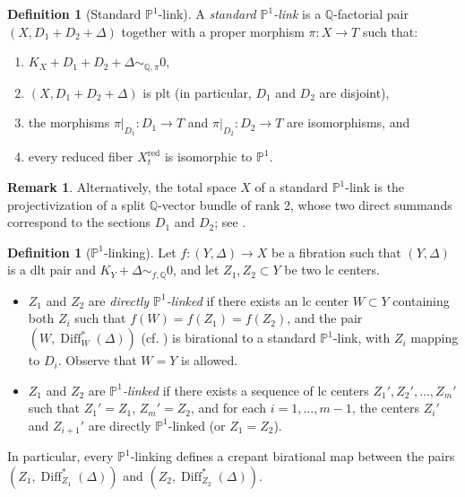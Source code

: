 \documentclass{amsart}
\theoremstyle{definition}
\newtheorem{definition}[theorem]{Definition}
\newtheorem{remark}[theorem]{Remark}
\theoremstyle{remark}
\def\bQ{\mathbb{Q}}
\def\bP{\mathbb{P}}
\numberwithin{equation}{section}
\begin{document}
\begin{definition}[Standard $\mathbb{P}^1$-link]\label{def:P1link}
A \emph{standard $\mathbb{P}^1$-link} is a $\mathbb{Q}$-factorial pair $(X, D_1 + D_2 + \Delta)$ together with a proper morphism $\pi: X \to T$ such that:
\begin{enumerate}
    \item $K_X + D_1 + D_2 + \Delta \sim_{\mathbb{Q}, \pi} 0$,
    \item $(X, D_1 + D_2 + \Delta)$ is plt (in particular, $D_1$ and $D_2$ are disjoint),
    \item the morphisms $\pi|_{D_1}: D_1 \to T$ and $\pi|_{D_2}: D_2 \to T$ are isomorphisms, and
    \item every reduced fiber $X_t^{\mathrm{red}}$ is isomorphic to $\mathbb{P}^1$.
\end{enumerate}
\end{definition}
\begin{remark}
Alternatively, the total space $X$ of a standard $\mathbb{P}^1$-link is the projectivization of a split $\bQ$-vector bundle of rank 2, whose two direct summands correspond to the sections $D_1$ and $D_2$; see \cite[Thm.~1.4]{Moraga24}.
\end{remark}
\begin{definition}[$\bP^1$-linking]
Let $f \colon (Y, \Delta) \to X$ be a fibration
such that $(Y, \Delta)$ is a dlt pair and $K_{Y} + \Delta \sim_{f, \bQ} 0$,
and let \( Z_1, Z_2 \subset Y \) be two lc centers. 
\begin{itemize}
\item \( Z_1 \) and \( Z_2 \) are \emph{directly \(\mathbb{P}^1\)-linked} if there exists an lc center \( W \subset Y \) containing both \( Z_i \) such that
$
f(W) = f(Z_1) = f(Z_2)$, 
and the pair \( (W, \operatorname{Diff}^*_W(\Delta)) \) (cf. \cite[\S 4.18]{kol13}) is birational to a standard \( \mathbb{P}^1 \)-link, with \( Z_i \) mapping to \( D_i \). Observe that \( W = Y \) is allowed.
\item \( Z_1\) and \(Z_2\) are \emph{\(\mathbb{P}^1\)-linked} if there exists a sequence of lc centers $Z_1', Z_2', \dots, Z_m'$
such that \( Z_1' = Z_1 \), \( Z_m' = Z_2 \), and for each \( i = 1, \dots, m-1 \), the centers \( Z_i' \) and \( Z_{i+1}' \) are directly \( \mathbb{P}^1 \)-linked (or \( Z_1 = Z_2 \)).
\end{itemize}
\end{definition}

In particular, every \( \mathbb{P}^1 \)-linking defines a crepant birational map between the pairs \( (Z_1, \operatorname{Diff}^*_{Z_1}(\Delta)) \) and \( (Z_2, \operatorname{Diff}^*_{Z_2}(\Delta)) \). 
\end{document}
